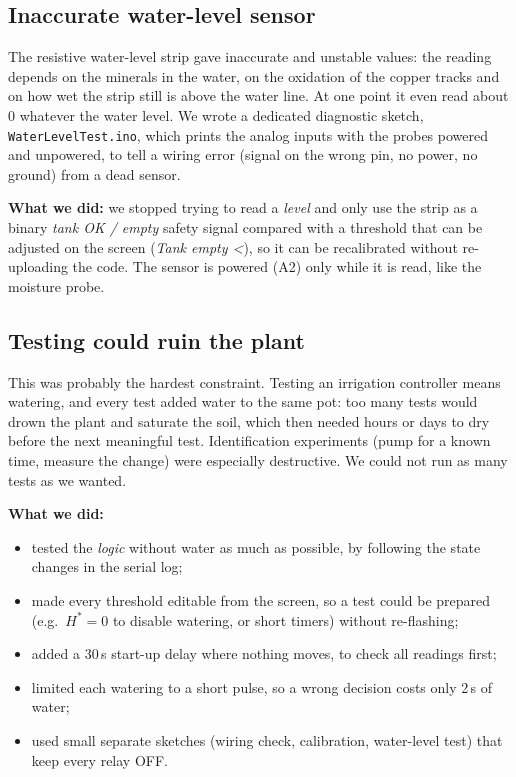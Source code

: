 \documentclass[10pt,a4paper,twocolumn]{article}
\newcommand{\code}[1]{\texttt{#1}}
\begin{document}
\subsection{Inaccurate water-level sensor}
The resistive water-level strip gave inaccurate and unstable values: the reading
depends on the minerals in the water, on the oxidation of the copper tracks and on how
wet the strip still is above the water line. At one point it even read about 0 whatever
the water level. We wrote a dedicated diagnostic sketch, \code{WaterLevelTest.ino},
which prints the analog inputs with the probes powered and unpowered, to tell a wiring
error (signal on the wrong pin, no power, no ground) from a dead sensor.

\textbf{What we did:} we stopped trying to read a \emph{level} and only use the strip
as a binary \emph{tank OK / empty} safety signal compared with a threshold that can be
adjusted on the screen (\emph{Tank empty <}), so it can be recalibrated without
re-uploading the code. The sensor is powered (A2) only while it is read, like the
moisture probe.

\subsection{Testing could ruin the plant}
This was probably the hardest constraint. Testing an irrigation controller means
watering, and every test added water to the same pot: too many tests would drown the
plant and saturate the soil, which then needed hours or days to dry before the next
meaningful test. Identification experiments (pump for a known time, measure the
change) were especially destructive. We could not run as many tests as we wanted.

\textbf{What we did:}
\begin{itemize}
  \item tested the \emph{logic} without water as much as possible, by following the
        state changes in the serial log;
  \item made every threshold editable from the screen, so a test could be prepared
        (e.g.\ $H^*=0$ to disable watering, or short timers) without re-flashing;
  \item added a 30\,s start-up delay where nothing moves, to check all readings first;
  \item limited each watering to a short pulse, so a wrong decision costs only 2\,s of
        water;
  \item used small separate sketches (wiring check, calibration, water-level test)
        that keep every relay OFF.
\end{itemize}
\end{document}
